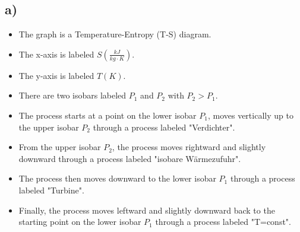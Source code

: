 

\subsection*{a)}

\begin{itemize}
    \item The graph is a Temperature-Entropy (T-S) diagram.
    \item The x-axis is labeled \( S \left( \frac{kJ}{kg \cdot K} \right) \).
    \item The y-axis is labeled \( T(K) \).
    \item There are two isobars labeled \( P_1 \) and \( P_2 \) with \( P_2 > P_1 \).
    \item The process starts at a point on the lower isobar \( P_1 \), moves vertically up to the upper isobar \( P_2 \) through a process labeled "Verdichter".
    \item From the upper isobar \( P_2 \), the process moves rightward and slightly downward through a process labeled "isobare Wärmezufuhr".
    \item The process then moves downward to the lower isobar \( P_1 \) through a process labeled "Turbine".
    \item Finally, the process moves leftward and slightly downward back to the starting point on the lower isobar \( P_1 \) through a process labeled "T=const".
\end{itemize}